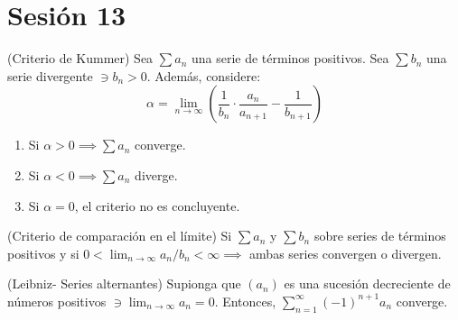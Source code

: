 \section{Sesión 13}

\begin{teorema} (Criterio de Kummer)
	Sea $\sum a_n$ una serie de términos positivos. Sea $\sum b_n$ una serie divergente $\ni b_n>0$. Además, considere: 
	$$\alpha =\lim_{n\to\infty}\left(\frac{1}{b_n}\cdot \frac{a_n}{a_{n+1}}-\frac{1}{b_{n+1}}\right)$$
	\begin{enumerate}
		\item Si $\alpha >0\implies \sum a_n$ converge. 
		\item Si $\alpha <0\implies \sum a_n$ diverge. 
		\item Si $\alpha =0$, el criterio no es concluyente. 
	\end{enumerate}
\end{teorema}

\begin{teorema}(Criterio de comparación en el límite)
	Si $\sum a_n$ y $\sum b_n$ sobre series de términos positivos y si $0<\lim_{n\to\infty}a_n/b_n<\infty\implies$ ambas series convergen o divergen. 
\end{teorema}

\begin{teorema}(Leibniz- Series alternantes)
	Supionga que $(a_n)$ es una sucesión decreciente de números positivos $\ni \lim_{n\to\infty}a_n=0$. Entonces, $\sum_{n=1}^{\infty} (-1)^{n+1} a_n$ converge. 
\end{teorema}


